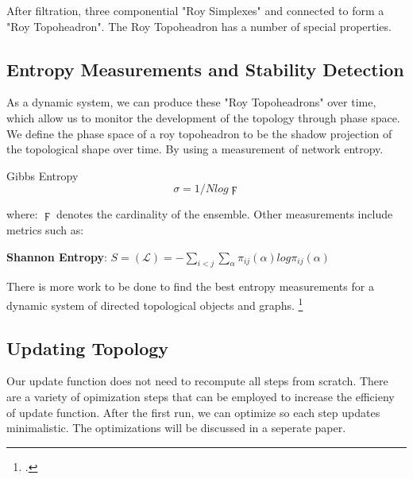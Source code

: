 After filtration, three componential "Roy Simplexes" and connected to form a "Roy Topoheadron". The Roy Topoheadron has a number of special properties.

\subsection{Entropy Measurements and Stability Detection}
As a dynamic system, we can produce these "Roy Topoheadrons" over time, which allow us to monitor the development of the topology through phase space. We define the phase space of a roy topoheadron to be the shadow projection of the topological shape over time. By using a measurement of network entropy. 

Gibbs Entropy
\begin{equation}
\sigma = 1/N log \digamma
\end{equation}

where: $\digamma$ denotes the cardinality of the ensemble. Other measurements include metrics such as:\\
\newline

\begin{center}
  \textbf{Shannon Entropy}: $S = (\mathcal{L}) = - \sum_{i<j} \sum_{\alpha} \pi_{ij}(\alpha)log\pi_{ij}(\alpha) $
\end{center}
There is more work to be done to find the best entropy measurements for a dynamic system of directed topological objects and graphs. \footcite{Bianconi2009}

\subsection{Updating Topology}
Our update function does not need to recompute all steps from scratch. There are a variety of opimization steps that can be employed to increase the efficieny of update function. After the first run, we can optimize so each step updates minimalistic. The optimizations will be discussed in a seperate paper. 
